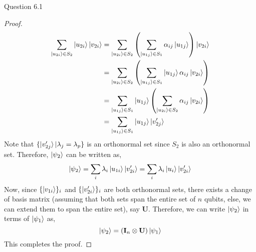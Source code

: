 \begin{solution}{Question 6.1}
\begin{proof}
        \begin{equation}
            \begin{split}
                \sum_{\ket{u_{2i}}\in S_2}\ket{u_{2i}}\ket{v_{2i}} &= \sum_{\ket{u_{2i}}\in S_2}\left(\sum_{\ket{u_{1j}}\in S_1}\alpha_{ij}\ket{u_{1j}}\right)\ket{v_{2i}}\\
                &= \sum_{\ket{u_{2i}}\in S_2}\left(\sum_{\ket{u_{1j}}\in S_1}\ket{u_{1j}}\alpha_{ij}\ket{v_{2i}}\right)\\
                &= \sum_{\ket{u_{1j}}\in S_1}\ket{u_{1j}}\left(\sum_{\ket{u_{2i}}\in S_2}\alpha_{ij}\ket{v_{2i}}\right)\\
                &= \sum_{\ket{u_{1j}}\in S_1}\ket{u_{1j}}\ket{v_{2j}'}
            \end{split}
        \end{equation}
        Note that $\{\ket{v_{2j}'} | \lambda_j = \lambda_p\}$ is an orthonormal set since $S_2$ is also an orthonormal set. Therefore, $\ket{\psi_2}$ can be written as,
        \begin{equation}
            \ket{\psi_2} = \sum_i\lambda_i\ket{u_{1i}}\ket{v_{2i}'} = \sum_i\lambda_i\ket{u_i}\ket{v_{2i}'}
        \end{equation}
        Now, since $\{\ket{v_{1i}}\}_i$ and $\{\ket{v_{2i}'}\}_i$ are both orthonormal sets, there exists a change of basis matrix (assuming that both sets span the entire set of $n$ qubits, else, we can extend them to span the entire set), say $\mathbf{U}$. Therefore, we can write $\ket{\psi_2}$ in terms of $\ket{\psi_1}$ as,
        \begin{equation}
            \ket{\psi_2} = (\mathbf{I}_n\otimes \mathbf{U})\ket{\psi_1}
        \end{equation}
        This completes the proof.
    \end{proof}
\end{solution}
